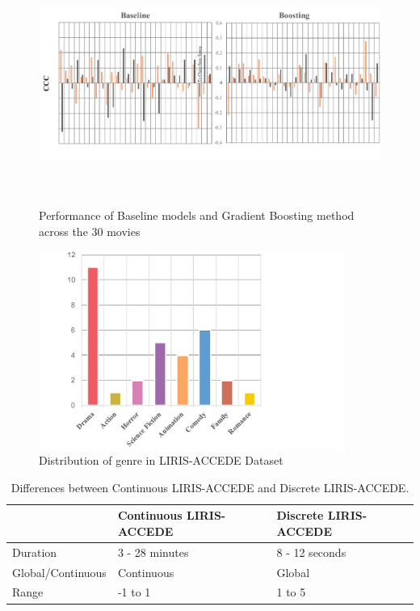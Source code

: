 \documentclass{article}
\begin{document}
\begin{figure}[t]
\includegraphics[width=\textwidth, height = 8cm]{images/comparison.pdf}
\centering
\caption{Performance of Baseline models and Gradient Boosting method across the 30 movies}
\label{comparison}
\end{figure}

\begin{figure}[t]
\includegraphics[width=10cm]{genre}
\centering
\caption{Distribution of genre in LIRIS-ACCEDE Dataset}
\label{genre}
\end{figure}

\begin{table}[t]
\centering
\begin{tabular}{|l|p{2.2cm}|p{2.2cm}|}
\hline
				& Continuous LIRIS-ACCEDE	& Discrete LIRIS-ACCEDE \\ \hline
Duration			& 3 - 28 minutes			& 8 - 12 seconds		\\ \hline	
Global/Continuous	& Continuous				& Global 				\\ \hline
Range			& -1 to 1					& 1 to 5				\\ \hline
\end{tabular}
\caption{Differences between Continuous LIRIS-ACCEDE and Discrete LIRIS-ACCEDE.}
\label{differences}
\end{table}
\end{document}
